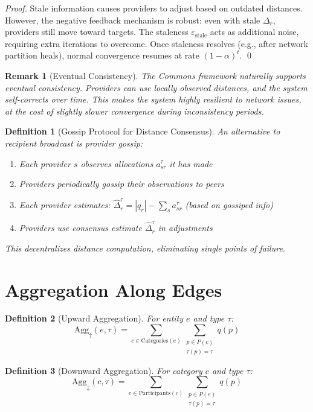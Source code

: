 \documentclass[11pt]{article}
\newtheorem{definition}{Definition}
\newtheorem{remark}{Remark}
\begin{document}
\begin{proof}
Stale information causes providers to adjust based on outdated distances. However, the negative feedback mechanism is robust: even with stale $\Delta_r$, providers still move toward targets. The staleness $\varepsilon_{\text{stale}}$ acts as additional noise, requiring extra iterations to overcome. Once staleness resolves (e.g., after network partition heals), normal convergence resumes at rate $(1-\alpha)^t$. \qed
\end{proof}

\begin{remark}[Eventual Consistency]
The Commons framework naturally supports eventual consistency. Providers can use locally observed distances, and the system self-corrects over time. This makes the system highly resilient to network issues, at the cost of slightly slower convergence during inconsistency periods.
\end{remark}

\begin{definition}[Gossip Protocol for Distance Consensus]
An alternative to recipient broadcast is provider gossip:
\begin{enumerate}
\item Each provider $s$ observes allocations $a_{sr}^\tau$ it has made
\item Providers periodically gossip their observations to peers
\item Each provider estimates: $\hat{\Delta}_r^\tau = |q_r| - \sum_s a_{sr}^\tau$ (based on gossiped info)
\item Providers use consensus estimate $\hat{\Delta}_r^\tau$ in adjustments
\end{enumerate}

This decentralizes distance computation, eliminating single points of failure.
\end{definition}

\section{Aggregation Along Edges}

\begin{definition}[Upward Aggregation]
For entity $e$ and type $\tau$:
\[
\text{Agg}_\uparrow(e, \tau) = \sum_{c \in \text{Categories}(e)} \sum_{\substack{p \in P(c) \\ \tau(p) = \tau}} q(p)
\]
\end{definition}

\begin{definition}[Downward Aggregation]
For category $c$ and type $\tau$:
\[
\text{Agg}_\downarrow(c, \tau) = \sum_{e \in \text{Participants}(c)} \sum_{\substack{p \in P(e) \\ \tau(p) = \tau}} q(p)
\]
\end{definition}
\end{document}
